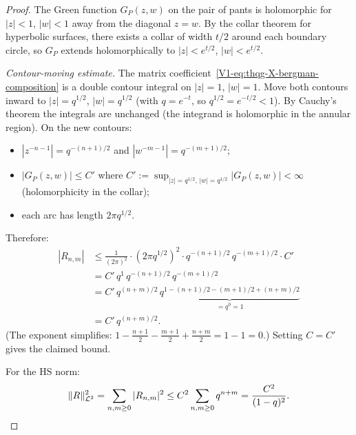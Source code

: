 \begin{proof}
The Green function $G_P(z,w)$ on the pair of pants is holomorphic
for $|z| < 1$, $|w| < 1$ away from the diagonal $z = w$.
By the collar theorem for hyperbolic surfaces, there exists a
collar of width $t/2$ around each boundary circle, so $G_P$ extends
holomorphically to $|z| < e^{t/2}$, $|w| < e^{t/2}$.

\emph{Contour-moving estimate.}
The matrix coefficient~\eqref{V1-eq:thqg-X-bergman-composition}
is a double contour integral on $|z| = 1$, $|w| = 1$.
Move both contours inward to $|z| = q^{1/2}$, $|w| = q^{1/2}$
(with $q = e^{-t}$, so $q^{1/2} = e^{-t/2} < 1$).
By Cauchy's theorem the integrals are unchanged (the
integrand is holomorphic in the annular region). On the new
contours:
\begin{itemize}
\item $|z^{-n-1}| = q^{-(n+1)/2}$ and
 $|w^{-m-1}| = q^{-(m+1)/2}$;
\item $|G_P(z,w)| \leq C'$ where
 $C' := \sup_{|z|=q^{1/2},\,|w|=q^{1/2}} |G_P(z,w)|
 < \infty$ (holomorphicity in the collar);
\item each arc has length $2\pi q^{1/2}$.
\end{itemize}
Therefore:
\begin{align*}
|R_{n,m}|
&\leq \frac{1}{(2\pi)^2}
 \cdot (2\pi q^{1/2})^2
 \cdot q^{-(n+1)/2}\,q^{-(m+1)/2}
 \cdot C' \\
&= C'\,q^{1}\,q^{-(n+1)/2}\,q^{-(m+1)/2} \\
&= C'\,q^{(n+m)/2}\,
 \underbrace{q^{1 - (n+1)/2 - (m+1)/2 + (n+m)/2}}_{= q^0 = 1}
 \\
&= C'\,q^{(n+m)/2}.
\end{align*}
(The exponent simplifies:
$1 - \frac{n+1}{2} - \frac{m+1}{2} + \frac{n+m}{2}
= 1 - 1 = 0$.)
Setting $C = C'$ gives the claimed bound.

For the HS norm:
\[
\|R\|_{\mathcal{L}^2}^2
= \sum_{n,m \geq 0} |R_{n,m}|^2
\leq C^2 \sum_{n,m \geq 0} q^{n+m}
= \frac{C^2}{(1-q)^2}.
\qedhere
\]
\end{proof}

